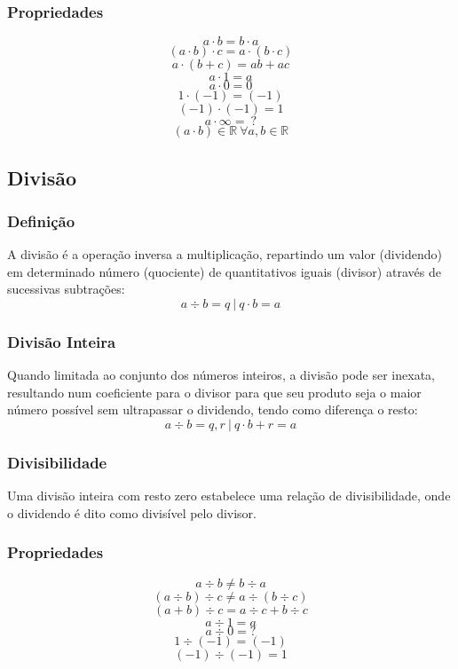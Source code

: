     \subsubsection{Propriedades}
        \begin{multicols}{3}
            \noindent\[ a \cdot b = b \cdot a \]
            \[ (a \cdot b) \cdot c = a \cdot (b \cdot c) \]
            \[ a \cdot (b + c) = ab + ac \]
            \[ a \cdot 1 = a \]
            \[ a \cdot 0 = 0 \]
            \[ 1 \cdot (-1) = (-1) \]
            \[ (-1) \cdot (-1) = 1 \]
            \[ a \cdot \infty = \ ? \]
            \[ (a \cdot b) \in \mathbb{R} \ \forall a,b \in \mathbb{R} \]
        \end{multicols}
\subsection{Divisão}
    \subsubsection{Definição}
        A divisão é a operação inversa a multiplicação, repartindo um valor (dividendo) em determinado número (quociente) de quantitativos iguais (divisor) através de sucessivas subtrações:
        \[ a \div b = q \ | \ q \cdot b = a \]
    \subsubsection{Divisão Inteira}
        Quando limitada ao conjunto dos números inteiros, a divisão pode ser inexata, resultando num coeficiente para o divisor para que seu produto seja o maior número possível sem ultrapassar o dividendo, tendo como diferença o resto:
        \[ a \div b = q, r \ | \ q \cdot b + r = a \]
    \subsubsection{Divisibilidade}
        Uma divisão inteira com resto zero estabelece uma relação de divisibilidade, onde o dividendo é dito como divisível pelo divisor. 
    \subsubsection{Propriedades}
        \begin{multicols}{2}
            \noindent\[ a \div b \neq b \div a \]
            \[ (a \div b) \div c \neq a \div (b \div c) \]
            \[ (a+b) \div c = a \div c + b \div c \]
            \[ a \div 1 = a \]
            \[ a \div 0 = ? \]
            \[ 1 \div (-1) = (-1) \]
            \[ (-1) \div (-1) = 1 \]
        \end{multicols}
